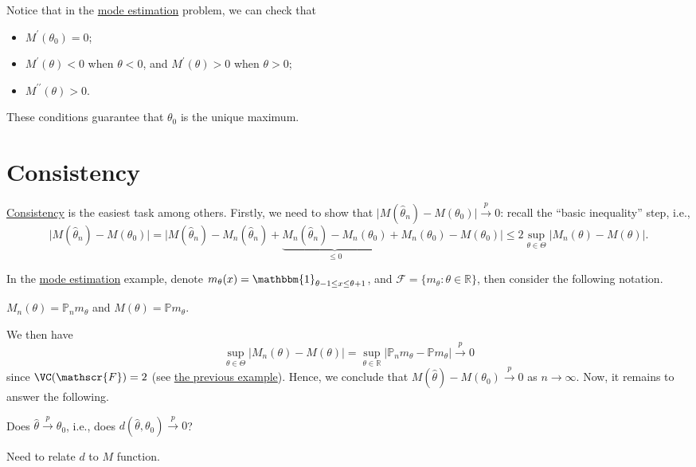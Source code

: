 \begin{remark}
	Notice that in the \hyperref[eg:mode-estimation]{mode estimation} problem, we can check that
	\begin{itemize}
		\item \(M^{\prime} (\theta _0) = 0\);
		\item \(M^{\prime} (\theta ) < 0\) when \(\theta < 0\), and \(M^{\prime} (\theta ) > 0\) when \(\theta > 0\);
		\item \(M^{\prime\prime} (\theta ) > 0\).
	\end{itemize}
	These conditions guarantee that \(\theta _0\) is the unique maximum.
\end{remark}

\section{Consistency}
\hyperref[prb:consistency]{Consistency} is the easiest task among others. Firstly, we need to show that \(\vert M(\hat{\theta} _n) - M(\theta _0) \vert \overset{p}{\to } 0\): recall the ``basic inequality'' step, i.e.,
\[
	\vert M(\hat{\theta} _n) - M(\theta _0) \vert
	= \vert M(\hat{\theta} _n) - M_n(\hat{\theta} _n) + \underbrace{M_n(\hat{\theta} _n) - M_n(\theta _0)}_{\leq 0} + M_n(\theta _0) - M(\theta _0) \vert
	\leq 2 \sup _{\theta \in \Theta } \vert M_n(\theta ) - M(\theta ) \vert.
\]

In the \hyperref[eg:mode-estimation]{mode estimation} example, denote \(m_\theta (x) = \mathbbm{1}_{\theta -1 \leq x \leq \theta +1} \), and \(\mathscr{F} = \{ m_\theta \colon \theta \in \mathbb{R} \} \), then consider the following notation.

\begin{notation}\label{not:M-estimation}
	\(M_n(\theta ) = \mathbb{P} _n m_\theta \) and \(M(\theta ) = \mathbb{P} m_\theta \).
\end{notation}

We then have
\[\sup _{\theta \in \Theta } \vert M_n(\theta ) - M(\theta ) \vert
	= \sup _{\theta \in \mathbb{R} }\vert \mathbb{P} _n m_\theta - \mathbb{P} m_\theta  \vert
	\overset{p}{\to } 0
\]
since \(\VC(\mathscr{F} ) = 2\) (see \hyperref[eg:VC-interval]{the previous example}). Hence, we conclude that \(M(\hat{\theta} ) - M(\theta _0) \overset{p}{\to } 0\) as \(n \to \infty \). Now, it remains to answer the following.

\begin{problem*}
	Does \(\hat{\theta} \overset{p}{\to} \theta _0\), i.e., does \(d(\hat{\theta} , \theta _0) \overset{p}{\to } 0\)?
\end{problem*}
\begin{answer}
	Need to relate \(d\) to \(M\) function.
\end{answer}